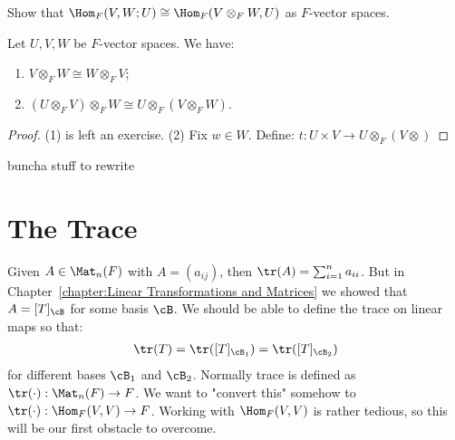     \begin{exercise}
        Show that $\Hom_F(V,W;U) \cong \Hom_F(V \otimes_F W, U)$ as $F$-vector spaces.
    \end{exercise}

    \begin{corollary}
        Let $U,V,W$ be $F$-vector spaces. We have:
            \begin{enumerate}[label = (\arabic*)]
                \item $V \otimes_F W \cong W \otimes_F V$;
                \item $(U \otimes_F V) \otimes_F W \cong U \otimes_F (V \otimes_F W)$.
            \end{enumerate}
    \end{corollary}
        \begin{proof}
            (1) is left an exercise. (2) Fix $w \in W$. Define:
                $t:U \times V \rightarrow U \otimes_F (V \otimes )$
        \end{proof}

    {\color{red} buncha stuff to rewrite}

\section{The Trace}
    Given $A \in \Mat_n(F)$ with $A = (a_{ij})$, then $\tr(A) = \sum_{i =1}^n a_{ii}$. But in Chapter~\ref{chapter:Linear Transformations and Matrices} we showed that $A = [T]_\cB$ for some basis $\cB$. We should be able to define the trace on linear maps so that:
        \begin{equation*}
        \begin{split}
            \tr(T) = \tr([T]_{\cB_1}) = \tr([T]_{\cB_2})
        \end{split}
        \end{equation*}
    for different bases $\cB_1$ and $\cB_2$. Normally trace is defined as $\tr(\cdot):\Mat_n(F) \rightarrow F$. We want to "convert this" somehow to $\tr(\cdot):\Hom_F(V,V) \rightarrow F$. Working with $\Hom_F(V,V)$ is rather tedious, so this will be our first obstacle to overcome.

